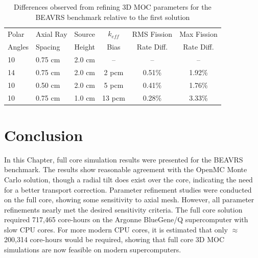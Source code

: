 \begin{table}[ht]
	\centering
	\caption{Differences observed from refining 3D MOC parameters for the BEAVRS benchmark relative to the first solution}
	\medskip
	\begin{tabular}{l|l|l|c|c|c}
		\hline
		Polar  & Axial Ray & Source & $k_{\textit{eff}}$  & \ac{RMS} Fission & Max Fission \\
		Angles & Spacing   & Height & Bias                & Rate Diff. & Rate Diff. \\
		\hline
		10 & 0.75 cm & 2.0 cm & --     & --     & --  \\
		14 & 0.75 cm & 2.0 cm & 2 pcm  & 0.51\% & 1.92\%  \\
		10 & 0.50 cm & 2.0 cm & 5 pcm  & 0.41\% & 1.76\%  \\
		10 & 0.75 cm & 1.0 cm & 13 pcm & 0.28\% & 3.33\%  \\
		\hline
	\end{tabular}
	\label{tab:fc-param-sensitivity}
\end{table}

\section{Conclusion}
\label{sec:fc-conclusion}

In this Chapter, full core simulation results were presented for the BEAVRS benchmark. The results show reasonable agreement with the OpenMC Monte Carlo solution, though a radial tilt does exist over the core, indicating the need for a better transport correction. Parameter refinement studies were conducted on the full core, showing some sensitivity to axial mesh. However, all parameter refinements nearly met the desired sensitivity criteria. The full core solution required 717,465 core-hours on the Argonne BlueGene/Q supercomputer with slow CPU cores. For more modern CPU cores, it is estimated that only $\approx$ 200,314 core-hours would be required, showing that full core 3D \ac{MOC} simulations are now feasible on modern supercomputers.


